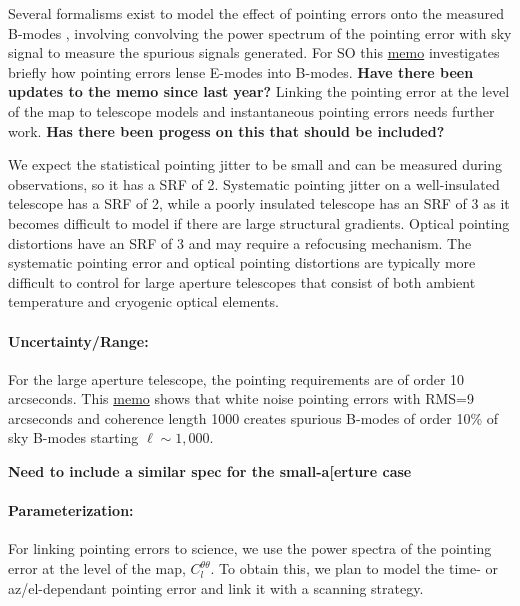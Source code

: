 Several formalisms exist to model the effect of pointing errors onto the measured B-modes \cite{hu03, Shimon_2008}, involving convolving the power spectrum of the pointing error with sky signal to measure the spurious signals generated. For SO this \href{http://simonsobservatory.wdfiles.com/local--files/calandsys-telecon/eb_leakage_from_pointing_error.pdf?ukey=61f26ef33e8439a4e7096ab52c54c523066a4e35}{memo} investigates briefly how pointing errors lense E-modes into B-modes. \textbf{Have there been updates to the memo since last year?} Linking the pointing error at the level of the map to telescope models and instantaneous pointing errors needs further work. \textbf{Has there been progess on this that should be included?}

We expect the statistical pointing jitter to be small and can be measured during observations, so it has a SRF of 2. Systematic pointing jitter on a well-insulated telescope has a SRF of 2, while a poorly insulated telescope has an SRF of 3 as it becomes difficult to model if there are large structural gradients. Optical pointing distortions have an SRF of 3 and may require a refocusing mechanism. The systematic pointing error and optical pointing distortions are typically more difficult to control for large aperture telescopes that consist of both ambient temperature and cryogenic optical elements. 

\paragraph{Uncertainty/Range:}
For the large aperture telescope, the pointing requirements are of order 10 arcseconds.
This \href{http://simonsobservatory.wdfiles.com/local--files/calandsys-telecon/eb_leakage_from_pointing_error.pdf?ukey=61f26ef33e8439a4e7096ab52c54c523066a4e35}{memo} shows that white noise pointing errors with RMS=9 arcseconds and coherence length 1000 creates spurious B-modes of order 10\% of sky B-modes starting $\ell \sim 1,000$.

\textbf{Need to include a similar spec for the small-a[erture case}


\paragraph{Parameterization:}
For linking pointing errors to science, we use the power spectra of the pointing error at the level of the map, $C_l^{\theta \theta}$. To obtain this, we plan to model the time- or az/el-dependant pointing error and link it with a scanning strategy.
